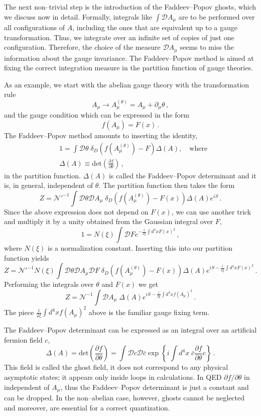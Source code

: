 \documentclass[11pt,a4paper]{article}
\newcommand{\be}{\begin{equation}}
\newcommand{\ee}{\end{equation}}
\newcommand\m{\mu}
\newcommand\D{\Delta}
\renewcommand\t{\theta}
\def\d{\partial}
\renewcommand{\D}{\mathcal{D}}
\begin{document}
The next non--trivial step is the introduction of the Faddeev--Popov ghosts, which we discuss now in detail. Formally, integrals like $\int \D A_\m$ are to be performed over all configurations of $A$, including the ones that are equivalent
up to a gauge transformation. Thus, we integrate over an infinite set of
copies of just one configuration. Therefore, the choice of the measure $\D A_\m$
seems to miss the information about the gauge invariance.
The Faddeev--Popov method is aimed at fixing the correct integration measure in the
partition function of gauge theories.


As an example, we start with the abelian gauge theory with the transformation rule
\be
A_\mu \to A^{(\t)}_\mu=A_\mu+\d_\m \t\,,
\ee
and the gauge condition which can be expressed in the form
\be
f(A_\mu)=F(x)\,.
\ee
The Faddeev--Popov method amounts to inserting the identity,
\be
\begin{split}
& 1=\int \D \t\;\delta_D(f(A_\m^{(\t)})-F)\Delta (A),\quad \text{where}\\
& \Delta (A)\equiv \text{det}\left(\frac{\d f}{\d \t}\right)\,,
\end{split}
\ee
in the partition function. $\Delta (A)$ is called the Faddeev--Popov determinant
and it is, in general, independent of $\t$.
The partition function then takes the form
\be
Z=\mathcal{N}'^{-1}\int \D \t \D A_\m \;
\delta_D(f(A_\m^{(\t)})-F(x))\Delta (A)e^{iS}\,.
\ee
Since the above expression does not depend on $F(x)$,
we can use another trick and multiply it by a unity obtained from the Gaussian integral over $F$,
\be
1=N(\xi)\int \D F e^{-\frac{i}{2\xi}\int d^4x F(x)^2}\,,
\ee
where $N(\xi)$ is a normalization constant.
Inserting this into our partition function yields
\be
Z=\mathcal{N}'^{-1}N(\xi)\int \D \t \D A_\m  \D F\;
\delta_D(f(A_\m^{(\t)})-F(x))\Delta (A)e^{iS-\frac{i}{2\xi}\int d^4x F(x)^2}\,.
\ee
Performing the integrals over $\t$ and $F(x)$ we get
\be
Z=\mathcal{N}^{-1}\int\D A_\m \;\Delta (A)e^{iS-\frac{i}{2\xi}\int d^4x f(A_\mu)^2}\,.
\ee
The piece $\frac{i}{2\xi}\int d^4x f(A_\mu)^2$ above is the  familiar gauge fixing term.

The Faddeev--Popov determinant can be expressed as an integral over an artificial fermion field
$c$,
\be
\label{eq:ghosts}
 \Delta(A)=\text{det}\left(\frac{\d f}{\d \t}\right)=\int \D c\D \bar c
 \exp\left\{i\int d^4x\; \bar c \frac{\d f}{\d \t}c\right\}\,.
\ee
This field is called the ghost field, it does not correspond to any physical asymptotic states;
it appears only inside loops in calculations.
In QED $\d f/\d\theta$ in independent of $A_\mu$, thus the Faddeev--Popov determinant is
just a constant and can be dropped.
In the non--abelian case, however, ghosts cannot be neglected
and moreover, are essential for a correct quantization.
\end{document}
